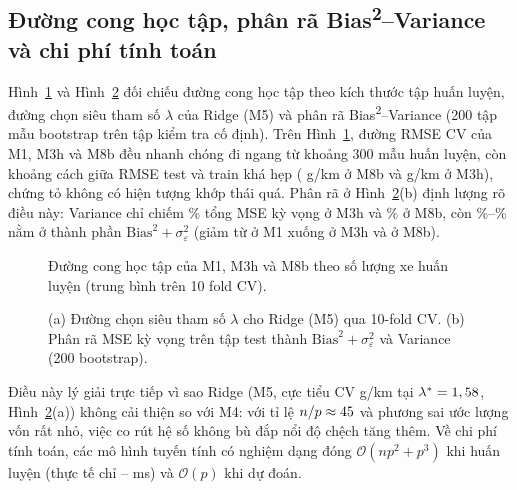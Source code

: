 \subsection{Đường cong học tập, phân rã \texorpdfstring{Bias\textsuperscript{2}}{Bias2}--Variance và chi phí tính toán}
Hình~\ref{fig:learning} và Hình~\ref{fig:ridge-bv} đối chiếu đường cong học tập theo kích thước tập huấn luyện, đường chọn siêu tham số $\lambda$ của Ridge (M5) và phân rã Bias\textsuperscript{2}--Variance (200 tập mẫu bootstrap trên tập kiểm tra cố định). Trên Hình~\ref{fig:learning}, đường RMSE CV của M1, M3h và M8b đều nhanh chóng đi ngang từ khoảng 300 mẫu huấn luyện, còn khoảng cách giữa RMSE test và train khá hẹp (\gapTestTrainEightB{} g/km ở M8b và \gapTestTrainThreeH{} g/km ở M3h), chứng tỏ không có hiện tượng khớp thái quá. Phân rã ở Hình~\ref{fig:ridge-bv}(b) định lượng rõ điều này: Variance chỉ chiếm \bvVarShareThreeH\% tổng MSE kỳ vọng ở M3h và \bvVarShareEightB\% ở M8b, còn \bvBiasShareEightB\%--\bvBiasShareThreeH\% nằm ở thành phần $\mathrm{Bias}^2 + \sigma_\varepsilon^2$ (giảm từ \bvBiasOne{} ở M1 xuống \bvBiasThreeH{} ở M3h và \bvBiasEightB{} ở M8b).

\begin{figure}[htbp]
  \centering
  
  \caption{Đường cong học tập của M1, M3h và M8b theo số lượng xe huấn luyện (trung bình trên 10 fold CV).}
  \label{fig:learning}
\end{figure}

\begin{figure}[htbp]
  \centering
  
  \caption{(a) Đường chọn siêu tham số $\lambda$ cho Ridge (M5) qua 10-fold CV. (b) Phân rã MSE kỳ vọng trên tập test thành $\mathrm{Bias}^2 + \sigma_\varepsilon^2$ và Variance (200 bootstrap).}
  \label{fig:ridge-bv}
\end{figure}

Điều này lý giải trực tiếp vì sao Ridge (M5, cực tiểu CV \ridgeBestCv{} g/km tại $\lambda^* = 1,58$, Hình~\ref{fig:ridge-bv}(a)) không cải thiện so với M4: với tỉ lệ $n/p \approx 45$ và phương sai ước lượng vốn rất nhỏ, việc co rút hệ số không bù đắp nổi độ chệch tăng thêm. Về chi phí tính toán, các mô hình tuyến tính có nghiệm dạng đóng $\mathcal{O}(np^2 + p^3)$ khi huấn luyện (thực tế chỉ \fitMsMin{}--\fitMsMax{} ms) và $\mathcal{O}(p)$ khi dự đoán.

